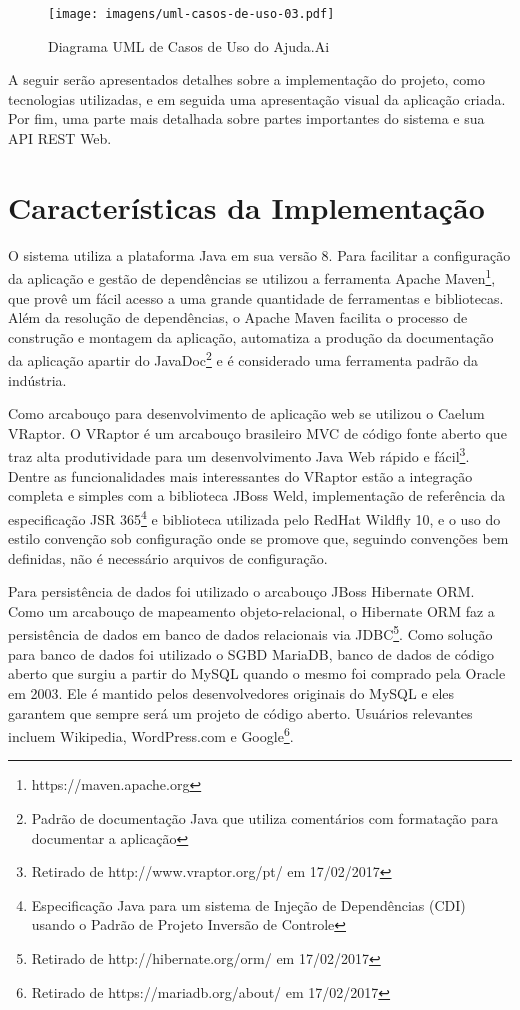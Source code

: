 \begin{figure}[H]
  \caption{\label{fig:uml_caso_uso}Diagrama UML de Casos de Uso do Ajuda.Ai}
  \centering
  \texttt{[image: imagens/uml-casos-de-uso-03.pdf]}
\end{figure}

A seguir serão apresentados detalhes sobre a implementação do projeto, como tecnologias utilizadas, e em seguida uma apresentação visual da aplicação criada. Por fim, uma parte mais detalhada sobre partes importantes do sistema e sua API REST Web.





\section{Características da Implementação} \label{sec:ajudaai:caracteristicas}

O sistema utiliza a plataforma Java em sua versão 8. Para facilitar a configuração da aplicação e gestão de dependências se utilizou a ferramenta Apache Maven\footnote{https://maven.apache.org}, que provê um fácil acesso a uma grande quantidade de ferramentas e bibliotecas. Além da resolução de dependências, o Apache Maven facilita o processo de construção e montagem da aplicação, automatiza a produção da documentação da aplicação apartir do JavaDoc\footnote{Padrão de documentação Java que utiliza comentários com formatação para documentar a aplicação} e é considerado uma ferramenta padrão da indústria.

Como arcabouço para desenvolvimento de aplicação web se utilizou o Caelum VRaptor. O VRaptor é um arcabouço brasileiro MVC de código fonte aberto que traz alta produtividade para um desenvolvimento Java Web rápido e fácil\footnote{Retirado de http://www.vraptor.org/pt/ em 17/02/2017}. Dentre as funcionalidades mais interessantes do VRaptor estão a integração completa e simples com a biblioteca JBoss Weld, implementação de referência da especificação JSR 365\footnote{Especificação Java para um sistema de Injeção de Dependências (CDI) usando o Padrão de Projeto Inversão de Controle} e biblioteca utilizada pelo RedHat Wildfly 10, e o uso do estilo convenção sob configuração onde se promove que, seguindo convenções bem definidas, não é necessário arquivos de configuração.

Para persistência de dados foi utilizado o arcabouço JBoss Hibernate ORM. Como um arcabouço de mapeamento objeto-relacional, o Hibernate ORM faz a persistência de dados em banco de dados relacionais via JDBC\footnote{Retirado de http://hibernate.org/orm/ em 17/02/2017}. Como solução para banco de dados foi utilizado o SGBD MariaDB, banco de dados de código aberto que surgiu a partir do MySQL quando o mesmo foi comprado pela Oracle em 2003. Ele é mantido pelos desenvolvedores originais do MySQL e eles garantem que sempre será um projeto de código aberto. Usuários relevantes incluem Wikipedia, WordPress.com e Google\footnote{Retirado de https://mariadb.org/about/ em 17/02/2017}.

